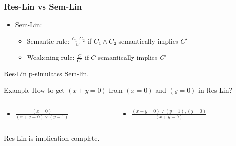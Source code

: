 \begin{frame}
    \frametitle{Res-Lin vs Sem-Lin}

    \begin{itemize}
		\item Sem-Lin:
			\begin{itemize}
				\item Semantic rule: $\frac{C_1, C_2}{C'}$ if $C_1 \land C_2$
		            semantically implies $C'$
				\item Weakening rule: $\frac{C}{C'}$ if $C$ semantically implies $C'$
			\end{itemize}
	\end{itemize}

	\pause
    \begin{theorem}
        Res-Lin p-simulates Sem-lin.
    \end{theorem}

	\pause
    \begin{block}{Example}
        How to get $(x + y = 0)$ from $(x = 0)$ and $(y = 0)$ in Res-Lin?
    \end{block}


    \begin{columns}
		\begin{column}{5cm}
            \begin{itemize}
            	\item $\frac{(x = 0)}{(x + y = 0) \lor (y = 1)}$
            \end{itemize}
		\end{column}
		\begin{column}{5cm}
            \begin{itemize}
            	\item $\frac{(x + y = 0) \lor (y = 1),(y = 0)}{(x + y = 0)}$
            \end{itemize}
		\end{column}
	\end{columns}

	\pause
    \begin{theorem}
        Res-Lin is implication complete.
    \end{theorem}


\end{frame}
